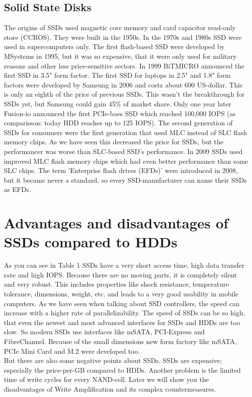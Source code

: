 \documentclass{acm_proc_article-sp}
\begin{document}
\subsection{Solid State Disks}
The origins of SSDs used magnetic core memory and card capacitor read-only store (CCROS). They were built in the 1950s. In the 1970s and 1980s SSD were used in supercomputers only. The first flash-based SSD were developed by MSystems in 1995, but it was so expensive, that it were only used for military reasons and other less price-sensitive sectors. In 1999 BiTMICRO announced the first SSD in 3.5" form factor. The first SSD for laptops in 2.5" and 1.8" form factors were developed by Samsung in 2006 and costz about 600 US-dollar. This is only an eighth of the price of previous SSDs. This wasn't the breakthrough for SSDs yet, but Samsung could gain 45\% of market share. Only one year later Fusion-io announced the first PCIe-baes SSD which reached 100,000 IOPS (as comparisson: today HDD reaches up to 125 IOPS). The second generation of SSDs for consumers were the first generation that used MLC instead of SLC flash memory chips. As we have seen this decreased the price for SSDs, but the performancer was worse than SLC-based SSD's performance. In 2009 SSDs used improved MLC flash memory chips which had even better performance than some SLC chips. The term 'Enterprise flash drives (EFDs)' were introduced in 2008, but it became never a standard, so every SSD-manufacturer can name their SSDs as EFDs.

\section{Advantages and disadvantages of SSDs compared to HDDs}

As you can see in Table 1 SSDs have a very short access time, high data transfer rate and high IOPS. Because there are no moving parts, it is completely silent and very robust. This includes properties like shock resistance, temperature tolerance, dimensions, weight, etc. and leads to a very good usability in mobile computers. As we have seen when talking about SSD controllers, the speed can increase with a higher rate of parallelizability. The speed of SSDs can be so high, that even the newest and most advanced interfaces for SSDs and HDDs are too slow. So modern SSDs use interfaces like mSATA, PCI-Express and FibreChannel. Because of the small dimensions new form factory like mSATA, PCIe Mini Card and M.2 were developed too.
\\
But there are also some negative points about SSDs. SSDs are expensive; especially the price-per-GB compared to HDDs. Another problem is the limited time of write cycles for every NAND-cell. Later we will show you the disadvantages of Write Amplification and its complex countermeasures.
\end{document}
